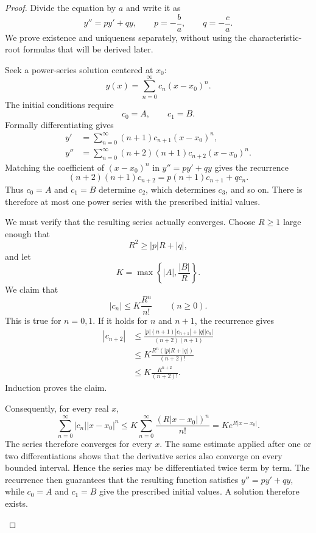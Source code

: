 \begin{proof}
    Divide the equation by \(a\) and write it as
    \[
        y''=p y'+q y,
        \qquad
        p=-\frac{b}{a},
        \qquad
        q=-\frac{c}{a}.
    \]
    We prove existence and uniqueness separately, without using the
    characteristic-root formulas that will be derived later.

    \begin{subproof}[Existence]
        Seek a power-series solution centered at \(x_0\):
        \[
            y(x)=\sum_{n=0}^{\infty}c_n(x-x_0)^n.
        \]
        The initial conditions require
        \[
            c_0=A,
            \qquad
            c_1=B.
        \]
        Formally differentiating gives
        \begin{align*}
            y'
            &=\sum_{n=0}^{\infty}(n+1)c_{n+1}(x-x_0)^n,\\
            y''
            &=\sum_{n=0}^{\infty}(n+2)(n+1)c_{n+2}(x-x_0)^n.
        \end{align*}
        Matching the coefficient of \((x-x_0)^n\) in
        \(y''=py'+qy\) gives the recurrence
        \[
            \boxed{
            (n+2)(n+1)c_{n+2}
            =p(n+1)c_{n+1}+q c_n.}
        \]
        Thus \(c_0=A\) and \(c_1=B\) determine \(c_2\), which determines
        \(c_3\), and so on.  There is therefore at most one power series
        with the prescribed initial values.

        We must verify that the resulting series actually converges.  Choose
        \(R\geq1\) large enough that
        \[
            R^2\geq |p|R+|q|,
        \]
        and let
        \[
            K=\max\left\{|A|,\frac{|B|}{R}\right\}.
        \]
        We claim that
        \[
            |c_n|\leq K\frac{R^n}{n!}
            \qquad(n\geq0).
        \]
        This is true for \(n=0,1\).  If it holds for \(n\) and \(n+1\),
        the recurrence gives
        \begin{align*}
            |c_{n+2}|
            &\leq
            \frac{|p|(n+1)|c_{n+1}|+|q||c_n|}
                 {(n+2)(n+1)}\\
            &\leq
            K\frac{R^n(|p|R+|q|)}{(n+2)!}\\
            &\leq K\frac{R^{n+2}}{(n+2)!}.
        \end{align*}
        Induction proves the claim.

        Consequently, for every real \(x\),
        \[
            \sum_{n=0}^{\infty}|c_n||x-x_0|^n
            \leq
            K\sum_{n=0}^{\infty}
            \frac{(R|x-x_0|)^n}{n!}
            =K e^{R|x-x_0|}.
        \]
        The series therefore converges for every \(x\).  The same estimate
        applied after one or two differentiations shows that the derivative
        series also converge on every bounded interval.  Hence the series
        may be differentiated twice term by term.  The recurrence then
        guarantees that the resulting function satisfies
        \(y''=py'+qy\), while \(c_0=A\) and \(c_1=B\) give the prescribed
        initial values.  A solution therefore exists.
    \end{subproof}


\end{proof}
